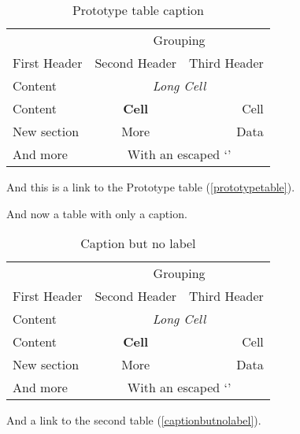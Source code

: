 
\def\mytitle{MultiMarkdown Table Test  }
\def\latexmode{memoir}

\begin{table}[htbp]
\begin{minipage}{\linewidth}
\setlength{\tymax}{0.5\linewidth}
\centering
\small
\caption{Prototype table caption}
\label{prototypetable}
\begin{tabular}{@{}lcr@{}} \toprule
&\multicolumn{2}{c}{Grouping}\\
First Header&Second Header&Third Header\\
\midrule
Content&\multicolumn{2}{c}{\emph{Long Cell}}\\
Content&\textbf{Cell}&Cell\\

\midrule
New section&More&Data\\
And more&\multicolumn{2}{c}{With an escaped `\textbar{}'}\\

\bottomrule

\end{tabular}
\end{minipage}
\end{table}


And this is a link to the Prototype table (\autoref{prototypetable}).

And now a table with only a caption.

\begin{table}[htbp]
\begin{minipage}{\linewidth}
\setlength{\tymax}{0.5\linewidth}
\centering
\small
\caption{Caption but no label}
\label{captionbutnolabel}
\begin{tabular}{@{}lcr@{}} \toprule
&\multicolumn{2}{c}{Grouping}\\
First Header&Second Header&Third Header\\
\midrule
Content&\multicolumn{2}{c}{\emph{Long Cell}}\\
Content&\textbf{Cell}&Cell\\

\midrule
New section&More&Data\\
And more&\multicolumn{2}{c}{With an escaped `\textbar{}'}\\

\bottomrule

\end{tabular}
\end{minipage}
\end{table}


And a link to the second table (\autoref{captionbutnolabel}).

